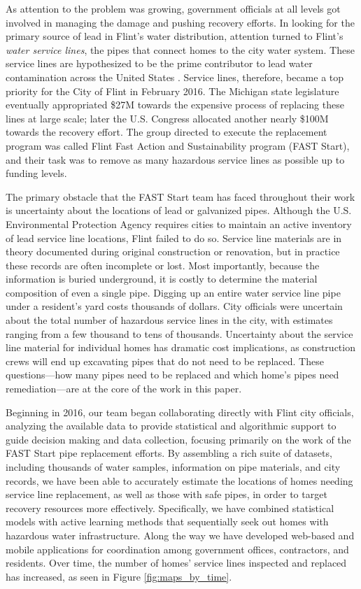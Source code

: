 \documentclass[sigconf]{acmart}
\begin{document}
As attention to the problem was growing, government officials at all levels got involved in managing the damage and pushing recovery efforts.  In looking for the primary source of lead in Flint's water distribution, attention turned to Flint's \emph{water service lines}, the pipes that connect homes to the city water system. These service lines are hypothesized to be the prime contributor to lead water contamination across the United States \citep{sandvig2008contribution}. Service lines, therefore, became a top priority for the City of Flint in February 2016. The Michigan state legislature eventually appropriated \$27M towards the expensive process of replacing these lines at large scale; later the U.S. Congress allocated another nearly \$100M towards the recovery effort. The group directed to execute the replacement program was called Flint Fast Action and Sustainability program (FAST Start), and their task was to remove as many hazardous service lines as possible up to funding levels.

The primary obstacle that the FAST Start team has faced throughout their work is uncertainty about the locations of lead or galvanized pipes.  Although the U.S. Environmental Protection Agency requires cities to maintain an active inventory of lead service line locations, Flint failed to do so. Service line materials are in theory documented during original construction or renovation, but in practice these records are often incomplete or lost. Most importantly, because the information is buried underground, it is costly to determine the material composition of even a single pipe. Digging up an entire water service line pipe under a resident's yard costs thousands of dollars.
City officials were uncertain about the total number of hazardous service lines in the city, with estimates ranging from a few thousand to tens of thousands.
Uncertainty about the service line material for individual homes has dramatic cost implications, as construction crews will end up excavating pipes that do not need to be replaced. These questions---how many pipes need to be replaced and which home's pipes need remediation---are at the core of the work in this paper.


Beginning in 2016, our team began collaborating directly with Flint city officials, analyzing the available data to provide statistical and algorithmic support to guide decision making and data collection, focusing primarily on the work of the FAST Start pipe replacement efforts. By assembling a rich suite of datasets, including thousands of water samples, information on pipe materials, and city records, we have been able to accurately estimate the locations of homes needing service line replacement, as well as those with safe pipes, in order to target recovery resources more effectively. Specifically, we have combined statistical models with active learning methods that sequentially seek out homes with hazardous water infrastructure. Along the way we have developed web-based and mobile applications for coordination among government offices, contractors, and residents. Over time, the number of homes' service lines inspected and replaced has increased, as seen in Figure \ref{fig:maps_by_time}.
\end{document}
